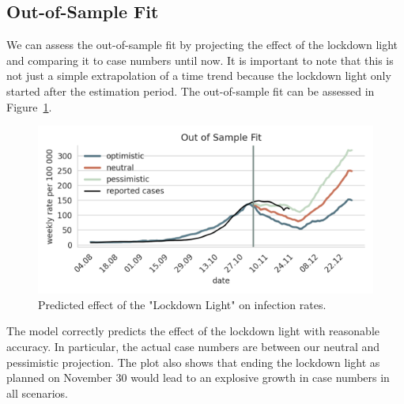 \subsection{Out-of-Sample Fit}
\label{sub:out_of_sample_fit}

We can assess the out-of-sample fit by projecting the effect of the lockdown light and
comparing it to case numbers until now. It is important to note that this is not just a
simple extrapolation of a time trend because the lockdown light only started after the
estimation period. The out-of-sample fit can be assessed in
Figure~\ref{fig:out-of-sample-fit}.

\begin{figure}[!tp]
    \centering
    \includegraphics[width=\textwidth]{../figures/out_of_sample_validation}
    \caption{Predicted effect of the "Lockdown Light" on infection rates.}
    \label{fig:out-of-sample-fit}
\end{figure}

The model correctly predicts the effect of the lockdown light with reasonable accuracy.
In particular, the actual case numbers are between our neutral and pessimistic
projection. The plot also shows that ending the lockdown light as planned on November 30
would lead to an explosive growth in case numbers in all scenarios.
